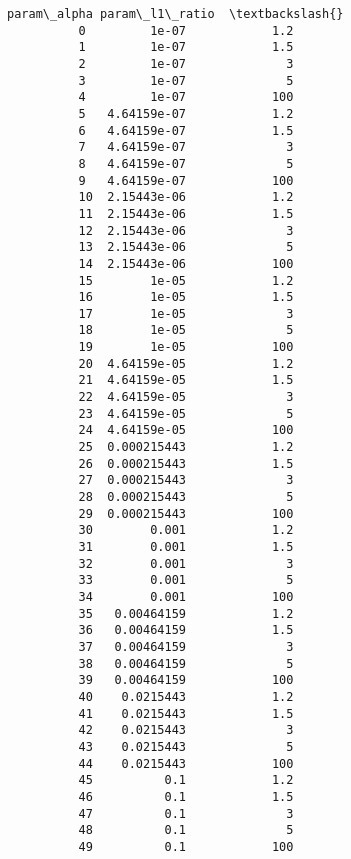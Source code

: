 \documentclass[11pt]{article}
\begin{document}
\begin{Verbatim}[commandchars=\\\{\}]
              param\_alpha param\_l1\_ratio  \textbackslash{}
          0         1e-07            1.2   
          1         1e-07            1.5   
          2         1e-07              3   
          3         1e-07              5   
          4         1e-07            100   
          5   4.64159e-07            1.2   
          6   4.64159e-07            1.5   
          7   4.64159e-07              3   
          8   4.64159e-07              5   
          9   4.64159e-07            100   
          10  2.15443e-06            1.2   
          11  2.15443e-06            1.5   
          12  2.15443e-06              3   
          13  2.15443e-06              5   
          14  2.15443e-06            100   
          15        1e-05            1.2   
          16        1e-05            1.5   
          17        1e-05              3   
          18        1e-05              5   
          19        1e-05            100   
          20  4.64159e-05            1.2   
          21  4.64159e-05            1.5   
          22  4.64159e-05              3   
          23  4.64159e-05              5   
          24  4.64159e-05            100   
          25  0.000215443            1.2   
          26  0.000215443            1.5   
          27  0.000215443              3   
          28  0.000215443              5   
          29  0.000215443            100   
          30        0.001            1.2   
          31        0.001            1.5   
          32        0.001              3   
          33        0.001              5   
          34        0.001            100   
          35   0.00464159            1.2   
          36   0.00464159            1.5   
          37   0.00464159              3   
          38   0.00464159              5   
          39   0.00464159            100   
          40    0.0215443            1.2   
          41    0.0215443            1.5   
          42    0.0215443              3   
          43    0.0215443              5   
          44    0.0215443            100   
          45          0.1            1.2   
          46          0.1            1.5   
          47          0.1              3   
          48          0.1              5   
          49          0.1            100   
          

\end{Verbatim}
\end{document}
